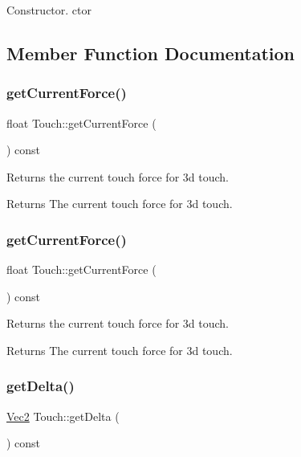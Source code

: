 Constructor.  ctor 

\subsection{Member Function Documentation}
\mbox{\label{classTouch_a05f094436515098deac33467fcb361d4}} 
\subsubsection{\texorpdfstring{get\+Current\+Force()}{getCurrentForce()}\hspace{0.1cm}{\footnotesize\ttfamily [1/2]}}
{\footnotesize\ttfamily float Touch\+::get\+Current\+Force (\begin{DoxyParamCaption}{ }\end{DoxyParamCaption}) const}

Returns the current touch force for 3d touch.

\begin{DoxyReturn}{Returns}
The current touch force for 3d touch. 
\end{DoxyReturn}
\mbox{\label{classTouch_a05f094436515098deac33467fcb361d4}} 
\subsubsection{\texorpdfstring{get\+Current\+Force()}{getCurrentForce()}\hspace{0.1cm}{\footnotesize\ttfamily [2/2]}}
{\footnotesize\ttfamily float Touch\+::get\+Current\+Force (\begin{DoxyParamCaption}{ }\end{DoxyParamCaption}) const}

Returns the current touch force for 3d touch.

\begin{DoxyReturn}{Returns}
The current touch force for 3d touch. 
\end{DoxyReturn}
\mbox{\label{classTouch_a386d29f52c790a8b5232a1e248390aa7}} 
\subsubsection{\texorpdfstring{get\+Delta()}{getDelta()}\hspace{0.1cm}{\footnotesize\ttfamily [1/2]}}
{\footnotesize\ttfamily \hyperlink{classVec2}{Vec2} Touch\+::get\+Delta (\begin{DoxyParamCaption}{ }\end{DoxyParamCaption}) const}

